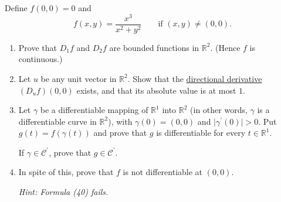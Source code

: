 	\begin{exercise}[Rudin 9.14]
		Define $f(0,0)=0$ and
		\begin{equation}
			f(x,y)=\frac{x^3}{x^2+y^2}
			\qquad \text{if } (x,y)\neq(0,0).
		\end{equation}

		\begin{enumerate}[label=(\alph*)]
			\item Prove that $D_1f$ and $D_2f$ are bounded functions in $\mathbb{R}^2$. (Hence $f$ is continuous.)

			\item Let $u$ be any unit vector in $\mathbb{R}^2$. Show that the \hyperref[def:directional-derivative]{directional derivative} $(D_uf)(0,0)$ exists, and that its absolute value is at most $1$.

			\item Let $\gamma$ be a differentiable mapping of $\mathbb{R}^1$ into $\mathbb{R}^2$ (in other words, $\gamma$ is a differentiable curve in $\mathbb{R}^2$), with $\gamma(0)=(0,0)$ and $\lvert\gamma^\prime(0)\rvert>0$. Put $g(t)=f(\gamma(t))$ and prove that $g$ is differentiable for every $t\in\mathbb{R}^1$.

			If $\gamma\in\mathscr{C}^\prime$, prove that $g\in\mathscr{C}^\prime$.

			\item In spite of this, prove that $f$ is not differentiable at $(0,0)$.

			\textit{Hint: Formula (40) fails.}
		\end{enumerate}
	\end{exercise}
